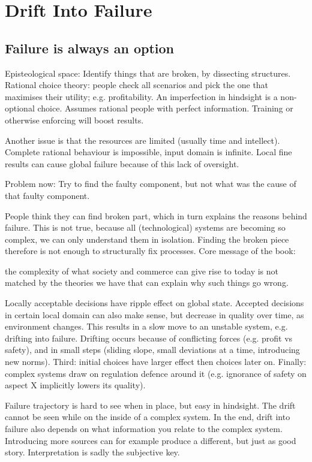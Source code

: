 \chapter{Drift Into Failure\cite{dekker2011drift}}
\section{Failure is always an option}
Episteological space: Identify things that are broken, by dissecting structures.
Rational choice theory: people check all scenarios and pick the one that maximises their utility; e.g. profitability. 
An imperfection in hindsight is a non-optional choice. 
Assumes rational people with perfect information. Training or otherwise enforcing will boost results. 

Another issue is that the resources are limited (usually time and intellect).
Complete rational behaviour is impossible, input domain is infinite.
Local fine results can cause global failure because of this lack of oversight.

Problem now: Try to find the faulty component, but not what was the cause of that faulty component.

People think they can find broken part, which in turn explains the reasons behind failure. 
This is not true, because all (technological) systems are becoming so complex, we can only understand them in isolation. 
Finding the broken piece therefore is not enough to structurally fix processes. 
Core message of the book: 
\begin{citation}
the complexity of what society and commerce can give rise to today is not matched by the theories we have that can explain why such things go wrong.
\end{citation}

Locally acceptable decisions have ripple effect on global state.
Accepted decisions in certain local domain can also make sense, but decrease in quality over time, as environment changes. 
This results in a slow move to an unstable system, e.g. drifting into failure.
Drifting occurs because of conflicting forces (e.g. profit vs safety), and in small steps (sliding slope, small deviations at a time, introducing new norms).
Third: initial choices have larger effect then choices later on.
Finally: complex systems draw on regulation defence around it (e.g. ignorance of safety on aspect X implicitly lowers its quality).

Failure trajectory is hard to see when in place, but easy in hindsight. 
The drift cannot be seen while on the inside of a complex system.
In the end, drift into failure also depends on what information you relate to the complex system. Introducing more sources can for example produce a different, but just as good story. 
Interpretation is sadly the subjective key.

